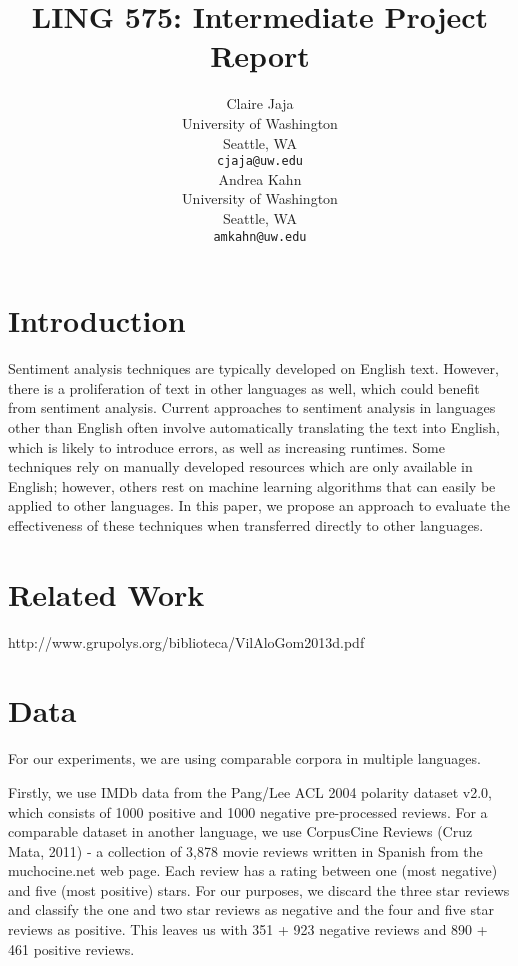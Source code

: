 \documentclass[11pt]{article}
\title{LING 575: Intermediate Project Report}
\author{Claire Jaja \\
  University of Washington \\
  Seattle, WA \\
  {\tt cjaja@uw.edu} \\\And
  Andrea Kahn \\
  University of Washington \\
  Seattle, WA \\
  {\tt amkahn@uw.edu} \\}
\date{}
\begin{document}
\maketitle
\begin{abstract}
\end{abstract}

\section{Introduction}

Sentiment analysis techniques are typically developed on English text.  However, there is a proliferation of text in other languages as well, which could benefit from sentiment analysis.  Current approaches to sentiment analysis in languages other than English often involve automatically translating the text into English, which is likely to introduce errors, as well as increasing runtimes.  Some techniques rely on manually developed resources which are only available in English; however, others rest on machine learning algorithms that can easily be applied to other languages.  In this paper, we propose an approach to evaluate the effectiveness of these techniques when transferred directly to other languages.

\section{Related Work}

http://www.grupolys.org/biblioteca/VilAloGom2013d.pdf

\section{Data}

For our experiments, we are using comparable corpora in multiple languages.

Firstly, we use IMDb data from the Pang/Lee ACL 2004 polarity dataset v2.0, which consists of 1000 positive and 1000 negative pre-processed reviews.  For a comparable dataset in another language, we use CorpusCine Reviews (Cruz Mata, 2011) - a collection of 3,878 movie reviews written in Spanish from the muchocine.net web page.  Each review has a rating between one (most negative) and five (most positive) stars.  For our purposes, we discard the three star reviews and classify the one and two star reviews as negative and the four and five star reviews as positive.  This leaves us with 351 + 923 negative reviews and 890 + 461 positive reviews.
\end{document}
